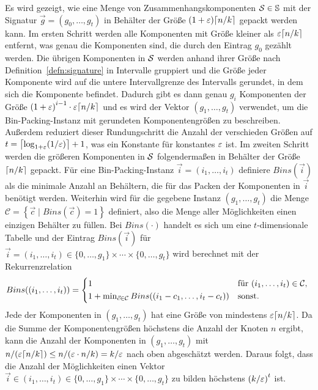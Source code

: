 Es wird gezeigt, wie eine Menge von Zusammenhangskomponenten $\calS \in \bbS$ mit der Signatur $\vec{g} = (g_0, \ldots, g_t)$ in Behälter der Größe $(1 + \eps) \ceil{n/k}$ gepackt werden kann.
Im ersten Schritt werden alle Komponenten mit Größe kleiner als $\eps \ceil*{n/k}$ entfernt, was genau die Komponenten sind, die durch den Eintrag $g_0$ gezählt werden.
Die übrigen Komponenten in $\calS$ werden anhand ihrer Größe nach Definition~\ref{defn:signature} in Intervalle gruppiert und die Größe jeder Komponente wird auf die untere Intervallgrenze des Intervalls gerundet, in dem sich die Komponente befindet.
Dadurch gibt es dann genau $g_i$ Komponenten der Größe ${(1 + \eps)}^{i-1} \cdot \eps \ceil*{n/k}$ und es wird der Vektor $(g_1, \ldots, g_t)$ verwendet, um die Bin-Packing-Instanz mit gerundeten Komponentengrößen zu beschreiben. 
Außerdem reduziert dieser Rundungschritt die Anzahl der verschieden Größen auf $t = \ceil*{\log_{1+\eps}(1/\eps)} + 1$, was ein Konstante für konstantes $\eps$ ist.
Im zweiten Schritt werden die größeren Komponenten in $\calS$ folgendermaßen in Behälter der Größe $\ceil{n/k}$ gepackt.
Für eine Bin-Packing-Instanz $\vec{i} = (i_1, \ldots, i_t)$ definiere $Bins(\vec{i})$ als die minimale Anzahl an Behältern, die für das Packen der Komponenten in $\vec{i}$ benötigt werden.
Weiterhin wird für die gegebene Instanz $(g_1, \ldots, g_t)$ die Menge $\mathcal{C} = \left\{ \vec{c} \mid Bins(\vec{c}) = 1 \right\}$ definiert, also die Menge aller Möglichkeiten einen einzigen Behälter zu füllen.
Bei $Bins(\cdot)$ handelt es sich um eine $t$-dimensionale Tabelle und der Eintrag $Bins(\vec{i})$ für $\vec{i} = (i_1, \ldots, i_t) \in \{0, \ldots, g_1\} \times \cdots \times \{0, \ldots, g_t\}$ wird berechnet mit der Rekurrenzrelation 
\begin{equation*}
    Bins((i_1, \ldots, i_t)) = 
    \begin{cases*}
        1 & für $(i_1, \ldots, i_t) \in \mathcal{C}$, \\
        1 + \min_{\vec{c} \in \mathcal{C}} Bins((i_1 - c_1, \ldots, i_t - c_t)) & sonst. \\
    \end{cases*}
\end{equation*}
Jede der Komponenten in $(g_1, \ldots, g_t)$ hat eine Größe von mindestens $\eps \ceil*{n/k}$. 
Da die Summe der Komponentengrößen höchstens die Anzahl der Knoten $n$ ergibt, kann die Anzahl der Komponenten in $(g_1, \ldots, g_t)$ mit $n / (\eps \ceil{n/k}) \leq n / (\eps \cdot n/k) = k/\eps$ nach oben abgeschätzt werden.
Daraus folgt, dass die Anzahl der Möglichkeiten einen Vektor $\vec{i} \in (i_1, \ldots, i_t) \in \{0, \ldots, g_1\} \times \cdots \times \{0, \ldots, g_t\}$ zu bilden höchstens ${(k/\eps)}^t$ ist.
